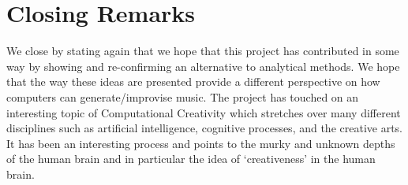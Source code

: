 \documentclass[pdftex,12pt,a4paper]{report}
\begin{document}
\section{Closing Remarks}
We close by stating again that we hope that this project has contributed in some way by showing and re-confirming an alternative to analytical methods. We hope that the way these ideas are presented provide a different perspective on how computers can generate/improvise music. The project has touched on an interesting topic of Computational Creativity which stretches over many different disciplines such as artificial intelligence, cognitive processes, and the creative arts. It has been an interesting process and points to the murky and unknown depths of the human brain and in particular the idea of `creativeness' in the human brain. 



\end{document}
